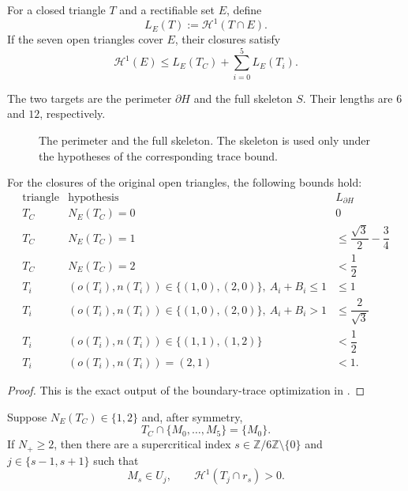 \begin{definition}
\label{def:trace-length}
For a closed triangle $T$ and a rectifiable set $E$, define
\[
 L_E(T):=\mathcal H^1(T\cap E).
\]
If the seven open triangles cover $E$, their closures satisfy
\begin{equation}
 \mathcal H^1(E)
 \le L_E(T_C)+\sum_{i=0}^5L_E(T_i).
 \label{eq:length-subadditivity}
\end{equation}
\end{definition}

The two targets are the perimeter $\partial H$ and the full skeleton $S$.
Their lengths are $6$ and $12$, respectively.

\begin{figure}[H]
\centering

\caption{The perimeter and the full skeleton.  The skeleton is used only
under the hypotheses of the corresponding trace bound.}
\label{fig:strategy1-targets}
\end{figure}

\begin{theorem}
\label{thm:boundary-trace-table}
For the closures of the original open triangles, the following bounds hold:
\begin{equation}
\begin{array}{c|c|c}
\text{triangle}&\text{hypothesis}&L_{\partial H}\\ \hline
T_C&N_E(T_C)=0&0\\
T_C&N_E(T_C)=1&\le\dfrac{\sqrt3}{2}-\dfrac34\\[3pt]
T_C&N_E(T_C)=2&<\dfrac12\\[3pt]
T_i&(o(T_i),n(T_i))\in\{(1,0),(2,0)\},\ A_i+B_i\le1&\le1\\
T_i&(o(T_i),n(T_i))\in\{(1,0),(2,0)\},\ A_i+B_i>1&\le\dfrac2{\sqrt3}\\[3pt]
T_i&(o(T_i),n(T_i))\in\{(1,1),(1,2)\}&<\dfrac12\\
T_i&(o(T_i),n(T_i))=(2,1)&<1.
\end{array}
\label{eq:boundary-trace-table}
\end{equation}
\end{theorem}

\begin{proof}
This is the exact output of the boundary-trace optimization in
.
\end{proof}

\begin{lemma}
\label{lem:positive-support-rescuer}
Suppose $N_E(T_C)\in\{1,2\}$ and, after symmetry,
\[
 T_C\cap\{M_0,\ldots,M_5\}=\{M_0\}.
\]
If $N_+\ge2$, then there are a supercritical index
$s\in\mathbb Z/6\mathbb Z\setminus\{0\}$ and
$j\in\{s-1,s+1\}$ such that
\[
 M_s\in U_j,
 \qquad
 \mathcal H^1(T_j\cap r_s)>0.
\]
\end{lemma}


